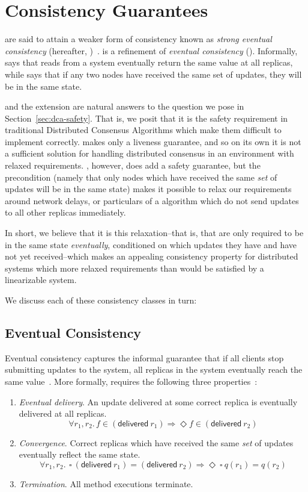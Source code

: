 \section{Consistency Guarantees}
\CRDTs are said to attain a weaker form of consistency known as \emph{strong
eventual consistency} (hereafter, \SEC)~\citep{shapiro11}. \SEC is a refinement
of \emph{eventual consistency} (\EC). Informally, \EC says that reads from a
system eventually return the same value at all replicas, while \SEC says that if
any two nodes have received the same set of updates, they will be in the same
state.

\EC and the \SEC extension are natural answers to the question we pose in
Section~\ref{sec:dca-safety}. That is, we posit that it is the safety
requirement in traditional Distributed Consensus Algorithms which make them
difficult to implement correctly. \EC makes only a liveness guarantee, and so on
its own it is not a sufficient solution for handling distributed consensus in an
environment with relaxed requirements. \SEC, however, does add a safety
guarantee, but the precondition (namely that only nodes which have received the
same \emph{set} of updates will be in the same state) makes it possible to relax
our requirements around network delays, or particulars of a \CRDT algorithm
which do not send updates to all other replicas immediately.

In short, we believe that it is this relaxation--that is, that \CRDTs are only
required to be in the same state \emph{eventually}, conditioned on which updates
they have and have not yet received--which makes \SEC an appealing consistency
property for distributed systems which more relaxed requirements than would be
satisfied by a linearizable system.

We discuss each of these consistency classes in turn:

\subsection{Eventual Consistency}
Eventual consistency captures the informal guarantee that if all clients stop
submitting updates to the system, all replicas in the system eventually reach
the same value~\citep{shapiro11}. More formally, \EC requires the following
three properties~\citep{shapiro11}:
\begin{enumerate}
  \item \emph{Eventual delivery}. An update delivered at some correct replica is
    eventually delivered at all replicas.
    \[
      \forall r_1, r_2.\, f \in (\textsf{delivered}~r_1) \Rightarrow \Diamond f
      \in (\textsf{delivered}~r_2)
    \]
  \item \emph{Convergence}. Correct replicas which have received the same
    \emph{set} of updates eventually reflect the same state.
    \[
      \forall r_1, r_2.\,~\square~(\textsf{delivered}~r_1) =
      (\textsf{delivered}~r_2) \Rightarrow \Diamond~\square~q(r_1) = q(r_2)
    \]
  \item \emph{Termination}. All method executions terminate.
\end{enumerate}

